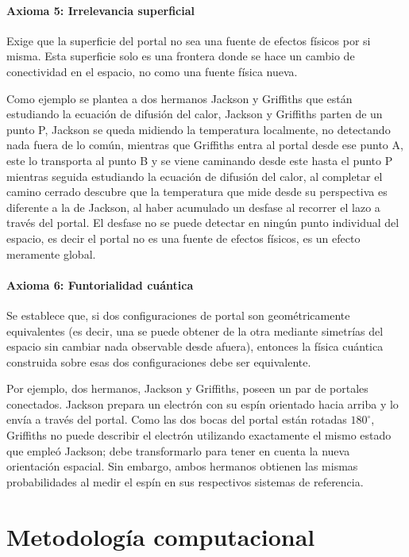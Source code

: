 \documentclass[12pt, twocolumn]{article}
\begin{document}
\paragraph{Axioma 5: Irrelevancia superficial}

Exige que la superficie del portal no sea una fuente de efectos físicos por si misma. Esta superficie solo es una frontera donde se hace un cambio de conectividad en el espacio, no como una fuente física nueva. 

Como ejemplo se plantea a dos hermanos Jackson y Griffiths que están estudiando la ecuación de difusión del calor, Jackson y Griffiths parten de un punto P, Jackson se queda midiendo la temperatura localmente, no detectando nada fuera de lo común, mientras que Griffiths entra al portal desde ese punto A, este lo transporta al punto B y se viene caminando desde este hasta el punto P mientras seguida estudiando la ecuación de difusión del calor, al completar el camino cerrado descubre que la temperatura que mide desde su perspectiva es diferente a la de Jackson, al haber acumulado un desfase al recorrer el lazo a través del portal. El desfase no se puede detectar en ningún punto individual del espacio, es decir el portal no es una fuente de efectos físicos, es un efecto meramente global.

\paragraph{Axioma 6: Funtorialidad cuántica}

Se establece que, si dos configuraciones de portal son geométricamente equivalentes (es decir, una se puede obtener de la otra mediante simetrías del espacio sin cambiar nada observable desde afuera), entonces la física cuántica construida sobre esas dos configuraciones debe ser equivalente.

Por ejemplo, dos hermanos, Jackson y Griffiths, poseen un par de portales conectados. Jackson prepara un electrón con su espín orientado hacia arriba y lo envía a través del portal. Como las dos bocas del portal están rotadas $180^\circ$, Griffiths no puede describir el electrón utilizando exactamente el mismo estado que empleó Jackson; debe transformarlo para tener en cuenta la nueva orientación espacial. Sin embargo, ambos hermanos obtienen las mismas probabilidades al medir el espín en sus respectivos sistemas de referencia.

\section{Metodología computacional}
\end{document}
